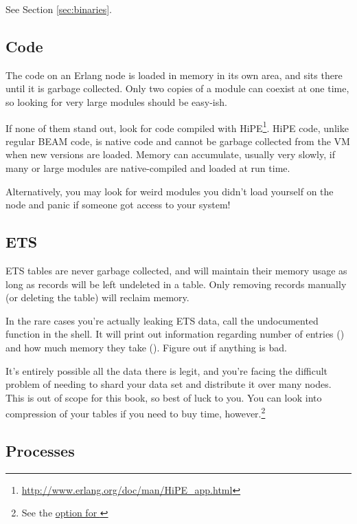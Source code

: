 \documentclass[11pt, oneside]{book}   	%
\begin{document}
See Section \ref{sec:binaries}.

\subsection{Code}

The code on an Erlang node is loaded in memory in its own area, and sits there until it is garbage collected. Only two copies of a module can coexist at one time, so looking for very large modules should be easy-ish.

If none of them stand out, look for code compiled with HiPE\footnote{\href{http://www.erlang.org/doc/man/HiPE\_app.html}{http://www.erlang.org/doc/man/HiPE\_app.html}}. HiPE code, unlike regular BEAM code, is native code and cannot be garbage collected from the VM when new versions are loaded. Memory can accumulate, usually very slowly, if many or large modules are native-compiled and loaded at run time.

Alternatively, you may look for weird modules you didn't load yourself on the node and panic if someone got access to your system!

\subsection{ETS}

ETS tables are never garbage collected, and will maintain their memory usage as long as records will be left undeleted in a table. Only removing records manually (or deleting the table) will reclaim memory.

In the rare cases you're actually leaking ETS data, call the undocumented  function in the shell. It will print out information regarding number of entries () and how much memory they take (). Figure out if anything is bad.

It's entirely possible all the data there is legit, and you're facing the difficult problem of needing to shard your data set and distribute it over many nodes. This is out of scope for this book, so best of luck to you. You can look into compression of your tables if you need to buy time, however.\footnote{See the \href{http://www.erlang.org/doc/man/ets.html\#new-2}{ option for }}

\subsection{Processes}
\end{document}

